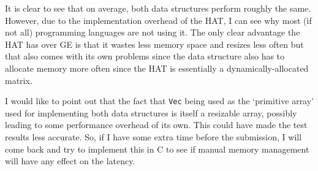 It is clear to see that on average, both data structures perform roughly the same. However, due to the implementation overhead of the HAT, I can see why most (if not all) programming languages are not using it. The only clear advantage the HAT has over GE is that it wastes less memory space and resizes less often but that also comes with its own problems since the data structure also has to allocate memory more often since the HAT is essentially a dynamically-allocated matrix.

I would like to point out that the fact that \texttt{Vec} being used as the `primitive array' used for implementing both data structures is itself a resizable array, possibly leading to some performance overhead of its own. This could have made the test results less accurate. So, if I have some extra time before the submission, I will come back and try to implement this in C to see if manual memory management will have any effect on the latency.

\endgroup
